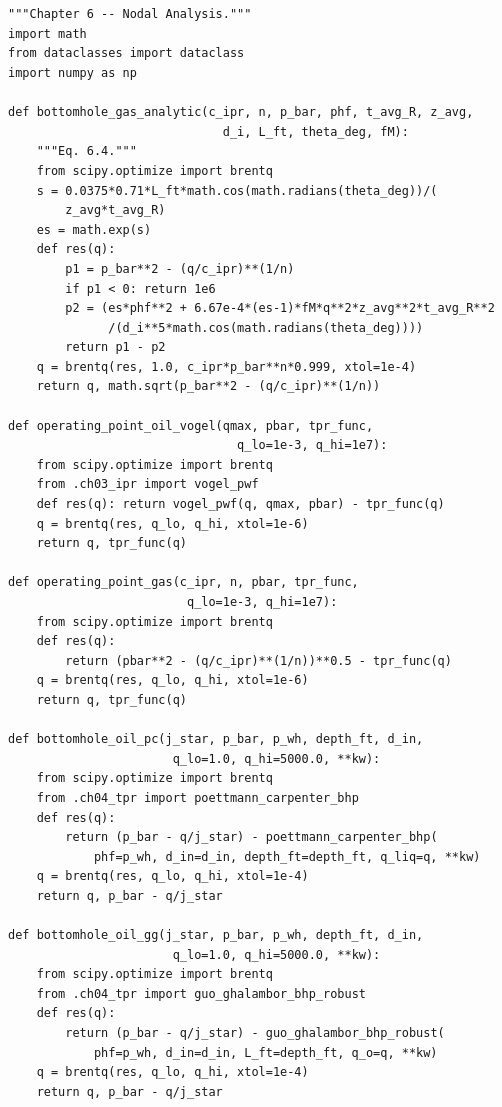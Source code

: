 \documentclass[10pt,a4paper,openany]{book}
\begin{document}
\chapter{}
\begin{lstlisting}
"""Chapter 6 -- Nodal Analysis."""
import math
from dataclasses import dataclass
import numpy as np

def bottomhole_gas_analytic(c_ipr, n, p_bar, phf, t_avg_R, z_avg,
                              d_i, L_ft, theta_deg, fM):
    """Eq. 6.4."""
    from scipy.optimize import brentq
    s = 0.0375*0.71*L_ft*math.cos(math.radians(theta_deg))/(
        z_avg*t_avg_R)
    es = math.exp(s)
    def res(q):
        p1 = p_bar**2 - (q/c_ipr)**(1/n)
        if p1 < 0: return 1e6
        p2 = (es*phf**2 + 6.67e-4*(es-1)*fM*q**2*z_avg**2*t_avg_R**2
              /(d_i**5*math.cos(math.radians(theta_deg))))
        return p1 - p2
    q = brentq(res, 1.0, c_ipr*p_bar**n*0.999, xtol=1e-4)
    return q, math.sqrt(p_bar**2 - (q/c_ipr)**(1/n))

def operating_point_oil_vogel(qmax, pbar, tpr_func,
                                q_lo=1e-3, q_hi=1e7):
    from scipy.optimize import brentq
    from .ch03_ipr import vogel_pwf
    def res(q): return vogel_pwf(q, qmax, pbar) - tpr_func(q)
    q = brentq(res, q_lo, q_hi, xtol=1e-6)
    return q, tpr_func(q)

def operating_point_gas(c_ipr, n, pbar, tpr_func,
                         q_lo=1e-3, q_hi=1e7):
    from scipy.optimize import brentq
    def res(q):
        return (pbar**2 - (q/c_ipr)**(1/n))**0.5 - tpr_func(q)
    q = brentq(res, q_lo, q_hi, xtol=1e-6)
    return q, tpr_func(q)

def bottomhole_oil_pc(j_star, p_bar, p_wh, depth_ft, d_in,
                       q_lo=1.0, q_hi=5000.0, **kw):
    from scipy.optimize import brentq
    from .ch04_tpr import poettmann_carpenter_bhp
    def res(q):
        return (p_bar - q/j_star) - poettmann_carpenter_bhp(
            phf=p_wh, d_in=d_in, depth_ft=depth_ft, q_liq=q, **kw)
    q = brentq(res, q_lo, q_hi, xtol=1e-4)
    return q, p_bar - q/j_star

def bottomhole_oil_gg(j_star, p_bar, p_wh, depth_ft, d_in,
                       q_lo=1.0, q_hi=5000.0, **kw):
    from scipy.optimize import brentq
    from .ch04_tpr import guo_ghalambor_bhp_robust
    def res(q):
        return (p_bar - q/j_star) - guo_ghalambor_bhp_robust(
            phf=p_wh, d_in=d_in, L_ft=depth_ft, q_o=q, **kw)
    q = brentq(res, q_lo, q_hi, xtol=1e-4)
    return q, p_bar - q/j_star


\end{lstlisting}
\end{document}
